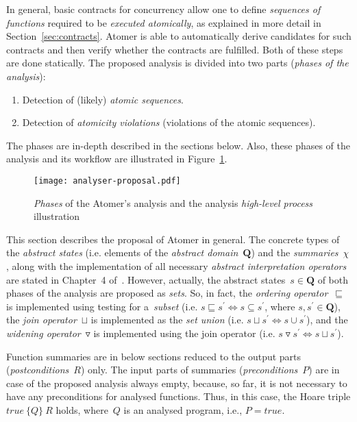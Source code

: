 In general, basic contracts for concurrency allow one to define \emph{sequences
of functions} required to be \emph{executed atomically}, as explained in more
detail in Section~\ref{sec:contracts}. Atomer is able to automatically derive
candidates for such contracts and then verify whether the contracts are
fulfilled. Both of these steps are done statically. The proposed analysis is
divided into two parts (\emph{phases of the analysis}):
\begin{enumerate}[label={\textbf{Phase~\arabic*}:}, leftmargin=5em]
    \item
        Detection of (likely) \emph{atomic sequences}.

    \item
        Detection of \emph{atomicity violations} (violations of the atomic
        sequences).
\end{enumerate}
The phases are in-depth described in the sections below. Also, these phases of
the analysis and its workflow are illustrated in
Figure~\ref{fig:atomerPhasesSequences}.

\begin{figure}[hbt]
    \centering
    \texttt{[image: analyser-proposal.pdf]}
    \caption{%
        \emph{Phases} of the Atomer's analysis and the analysis
        \emph{high-level process} illustration%
    }
    \label{fig:atomerPhasesSequences}
\end{figure}

This section describes the proposal of Atomer in general. The concrete types
of the \emph{abstract states} (i.e. elements of the \emph{abstract
domain}~$ \boldsymbol{Q} $) and the \emph{summaries}~$ \chi $, along with the
implementation of all necessary \emph{abstract interpretation operators}
are stated in Chapter~4 of~\cite{harmimBP}. However, actually, the abstract
states~$ s \in \boldsymbol{Q} $ of both phases of the analysis are proposed as
\emph{sets}. So, in fact, the \emph{ordering operator}~$ \sqsubseteq $ is
implemented using testing for a~\emph{subset} (i.e. $ s \sqsubseteq s^\prime
\Leftrightarrow s \subseteq s^\prime $, where $ s, s^\prime \in
\boldsymbol{Q} $), the \emph{join operator}~$ \sqcup $ is implemented as the
\emph{set union} (i.e. $ s \sqcup s^\prime \Leftrightarrow s \cup s^\prime $),
and the \emph{widening operator}~$ \triangledown $ is implemented using the
join operator (i.e. $ s \triangledown s^\prime \Leftrightarrow s \sqcup
s^\prime $).

Function summaries are in below sections reduced to the output parts
(\emph{postconditions}~$ R $) only. The input parts of summaries
(\emph{preconditions}~$ P $) are in case of the proposed analysis always empty,
because, so far, it is not necessary to have any preconditions for analysed
functions. Thus, in this case, the Hoare triple ${ true\ \{Q\}\ R }$ holds,
where~$ Q $ is an analysed program, i.e., $ P = true $.

